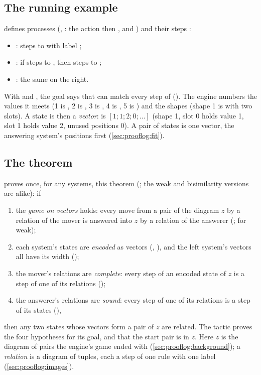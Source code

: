 \subsection{The running example}\label{sec:qed:example}

 defines processes  (,
: the action  then , and )
and their steps :
\begin{itemize}
\item {}:  steps to  with label ;
\item {}: if  steps to , then 
  steps to ;
\item {}: the same on the right.
\end{itemize}
With  and
, the goal says that  can match
every step of  (). The engine numbers the
values it meets (1 is , 2 is , 3 is , 4 is , 5 is ) and
the shapes (shape 1 is  with two slots). A state is then a
\emph{vector}:  is $[1; 1; 2; 0; \dots]$ (shape 1, slot 0
holds value 1, slot 1 holds value 2, unused positions 0). A pair of
states is one vector, the answering system's positions first
(\cref{sec:prooflog:fit}).

\subsection{The theorem}\label{sec:qed:theorem}

 proves once, for any systems, this theorem
(; the weak and bisimilarity versions are alike):
if
\begin{enumerate}
\item the \emph{game on vectors} holds: every move from a pair of the
  diagram $z$ by a relation of the mover is answered into $z$ by a
  relation of the answerer (;  for weak);
\item each system's states are \emph{encoded} as vectors (,
  ), and the left system's vectors all have its width
  ();
\item the mover's relations are \emph{complete}: every step of an encoded
  state of $z$ is a step of one of its relations ();
\item the answerer's relations are \emph{sound}: every step of one of its
  relations is a step of its states (),
\end{enumerate}
then any two states whose vectors form a pair of $z$ are related. The
tactic proves the four hypotheses for its goal, and that the start pair
is in $z$. Here $z$ is the diagram of pairs the engine's game ended with
(\cref{sec:prooflog:background}); a \emph{relation} is a diagram of
tuples, each a step of one rule with one label
(\cref{sec:prooflog:images}).

